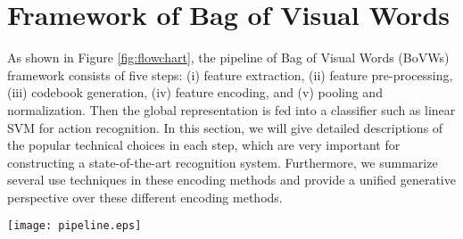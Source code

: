 \documentclass[twocolumn]{svjour3}          \smartqed  \usepackage{slashbox}
\begin{document}
\section{Framework of Bag of Visual Words}
\label{sec:method}
As shown in Figure \ref{fig:flowchart}, the pipeline of Bag of Visual Words (BoVWs) framework consists of five steps: (i) feature extraction, (ii) feature pre-processing, (iii) codebook generation, (iv) feature encoding, and (v) pooling and normalization. Then the global representation is fed into a classifier such as linear SVM for action recognition. In this section, we will give detailed descriptions of the popular technical choices in each step, which are very important for constructing a state-of-the-art recognition system. Furthermore, we summarize several use techniques in these encoding methods and provide a unified generative perspective over these different encoding methods.
\begin{figure*}
  \centerline{\texttt{[image: pipeline.eps]}}
  \caption{The pipeline of obtaining Bag of Visual Words (BoVWs) representation for action recognition. It is mainly composed of five steps: (i) feature extraction, (ii) feature pre-processing, (iii) codebook generation, (iv) feature encoding, and (v) pooling and normalization.}
  \label{fig:flowchart}
\end{figure*}
\end{document}
